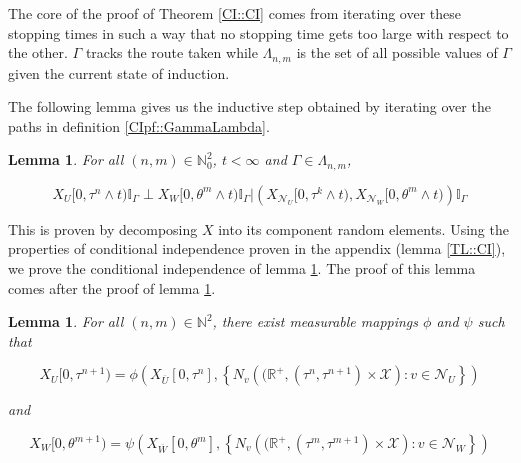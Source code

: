 \documentclass[12pt]{article}
\newcommand{\mb}{\mathbb}
\newcommand{\mc}{\mathcal}
\newcommand{\ov}{\overline}
\newcommand{\ind}{\hspace{24pt}}
\newcommand{\sta}{\mc{X}}							%
\newcommand{\neigh}[1]{\mc{N}_{#1}}					%
\newcommand{\cl}[1]{\ov{#1}}						%
\newcommand{\indx}[1]{^{#1}}						%
\newcommand{\Xf}{X}									%
\newcommand{\poiss}{N}								%
\newcommand{\poissv}[1]{_{#1}}						%
\newcommand{\vind}[1]{_{#1}}						%
\newcommand{\tmi}[1]{#1}							%
\newcommand{\seto}{U}								%
\newcommand{\sett}{W}								%
\newcommand{\rtt}{\theta}							%
\newcommand{\apath}{\Gamma}						%
\newcommand{\pathset}[2]{\Lambda_{#1,#2}}		%
\newcommand{\indo}{n}							%
\newcommand{\indt}{m}							%
\newcommand{\rt}{\tau}								%
\newtheorem{lem}[thms]{Lemma}
\begin{document}
The core of the proof of Theorem \ref{CI::CI} comes from iterating over these stopping times in such a way that no stopping time gets too large with respect to the other. \(\apath\) tracks the route taken while \(\pathset{\indo}{\indt}\) is the set of all possible values of \(\apath\) given the current state of induction.

\ind The following lemma gives us the inductive step obtained by iterating over the paths in definition \ref{CIpf::GammaLambda}.

\begin{lem}
For all \((\indo,\indt)\in \mb{N}_0^2\), \(t < \infty\) and \(\apath \in \pathset{\indo}{\indt}\),

\[\Xf\vind{\seto}\tmi{[0,\rt\indx{\indo}\wedge t)}\mb{I}_{\apath}\perp \Xf\vind{\sett}\tmi{[0,\rtt\indx{\indt}\wedge t)}\mb{I}_{\apath}|\left(\Xf\vind{\neigh{\seto}}\tmi{[0,\rt\indx{k}\wedge t)},\Xf\vind{\neigh{\sett}}\tmi{[0,\rtt\indx{\indt}\wedge t)}\right)\mb{I}_{\apath}\]
\label{CIpf::Induction}
\end{lem}

This is proven by decomposing \(\Xf\) into its component random elements. Using the properties of conditional independence proven in the appendix (lemma \ref{TL::CI}), we prove the conditional independence of lemma \ref{CIpf::Induction}. The proof of this lemma comes after the proof of lemma \ref{CIpf::Decomposition}.

\begin{lem}
For all \((\indo,\indt)\in \mb{N}^2\), there exist measurable mappings \(\phi\) and \(\psi\) such that 

\begin{equation}
\Xf\vind{\seto}\tmi{[0,\rt\indx{\indo+1})} = \phi\left(\Xf\vind{\cl{\seto}}\tmi{[0,\rt\indx{\indo}]}, \left\{\poiss\poissv{v}\left((\mb{R}^+,(\rt\indx{\indo},\rt\indx{\indo+1})\times \sta\right):v \in \neigh{\seto}\right\}\right)
\label{CIpf::XU forward map}
\end{equation}

and

\begin{equation}
\Xf\vind{\sett}\tmi{[0,\rtt\indx{\indt+1})} = \psi\left(\Xf\vind{\cl{\sett}}\tmi{[0,\rtt\indx{\indt}]}, \left\{\poiss\poissv{v}\left((\mb{R}^+,(\rt\indx{\indt},\rt\indx{\indt+1})\times \sta\right):v \in \neigh{\sett}\right\}\right)
\label{CIpf::XW forward map}
\end{equation}

\label{CIpf::Decomposition}
\end{lem}
\end{document}
